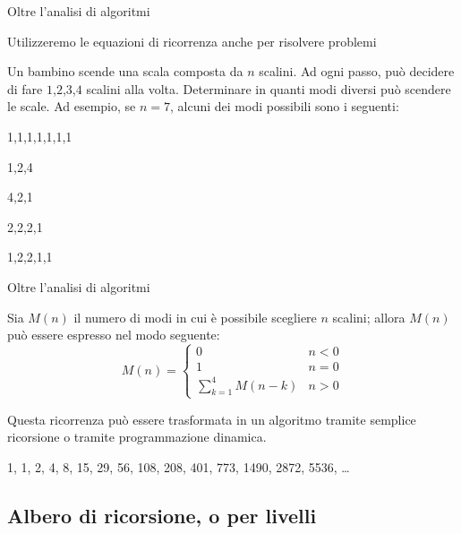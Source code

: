 \begin{frame}{Oltre l'analisi di algoritmi}

\begin{mybox}
Utilizzeremo le equazioni di ricorrenza anche per risolvere problemi
\end{mybox}

\begin{myboxtitle}[Problema]
Un bambino scende una scala composta da $n$ scalini. Ad ogni passo, può decidere di fare $1$,$2$,$3$,$4$ scalini alla volta. Determinare in quanti modi diversi può scendere le scale. Ad esempio, se $n=7$, alcuni dei modi possibili sono i seguenti:
\BI
\item 1,1,1,1,1,1,1
\item 1,2,4
\item 4,2,1
\item 2,2,2,1
\item 1,2,2,1,1
\EI
\end{myboxtitle}


\end{frame}

\begin{frame}{Oltre l'analisi di algoritmi}

\begin{myboxtitle}[Soluzione]
Sia $M(n)$ il numero di modi in cui è possibile scegliere $n$ scalini; allora $M(n)$ può essere espresso nel modo seguente:
\[
M(n) = \begin{cases}
  0 & n < 0 \\
  1 & n = 0 \\
  \sum_{k = 1}^{4} M(n-k) & n>0
\end{cases}
\]
\end{myboxtitle}

\begin{mybox}
Questa ricorrenza può essere trasformata in un algoritmo tramite semplice ricorsione o tramite programmazione dinamica.
\end{mybox}


\begin{myboxtitle}
1, 1, 2, 4, 8, 15, 29, 56, 108, 208, 401, 773, 1490, 2872, 5536, \ldots
\end{myboxtitle}


\end{frame}


\subsection{Albero di ricorsione, o per livelli}

